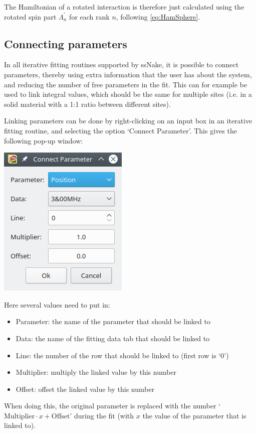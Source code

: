\documentclass[11pt,a4paper]{article}
\begin{document}
The Hamiltonian of a rotated interaction is therefore just calculated using the rotated spin part
$\Lambda^\prime_n$ for each rank $n$, following \autoref{eq:HamSphere}.




\subsection{Connecting parameters}
In all iterative fitting routines supported by ssNake, it is possible to connect parameters, thereby using
extra information that the user has about the system, and reducing the number of free parameters in
the fit. This can for example be used to link integral values, which should be the same for multiple
sites (i.e. in a solid material with a 1:1 ratio between different sites).

Linking parameters can be done by right-clicking on an input box in an iterative fitting
routine, and selecting the option `Connect Parameter'. This gives the following pop-up window:
\begin{center}
\includegraphics[width=0.3\linewidth]{Images/ConnectPars.png}
\end{center}

Here several values need to put in:
\begin{itemize}
  \item Parameter: the name of the parameter that should be linked to
  \item Data: the name of the fitting data tab that should be linked to
  \item Line: the number of the row that should be linked to (first row is `0')
  \item Multiplier: multiply the linked value by this number
  \item Offset: offset the linked value by this number
\end{itemize}
When doing this, the original parameter is replaced with the number `$\text{Multiplier} \cdot x +
\text{Offset}$' during the fit (with $x$ the value of the parameter that is linked to).
\end{document}

